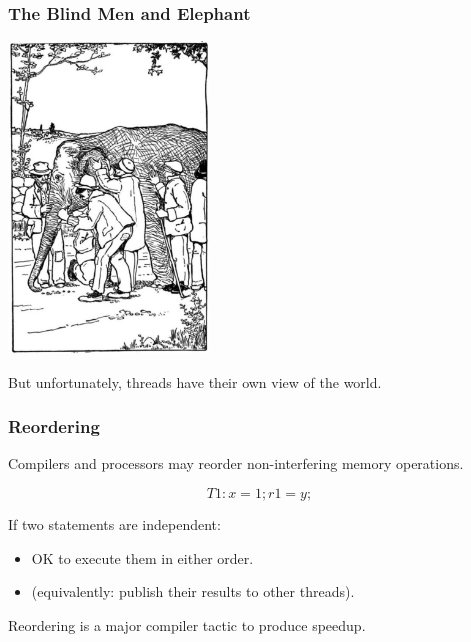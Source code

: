 \begin{frame}
\frametitle{The Blind Men and Elephant}

\begin{center}
	\includegraphics[width=0.4\textwidth]{images/Blind_men_and_elephant.jpg}
\end{center}

But unfortunately, threads have their own view of the world.

\end{frame}

\begin{frame}
  \frametitle{Reordering}

  
     Compilers and processors may reorder non-interfering memory
     operations.

      \[ T1: x = 1; r1 = y; \]

     If two statements are independent:
     \begin{itemize}
        \item OK to execute them in either order.
        \item (equivalently: publish their results to other threads).
     \end{itemize}

     Reordering is a major compiler tactic to produce speedup.
  
\end{frame}


